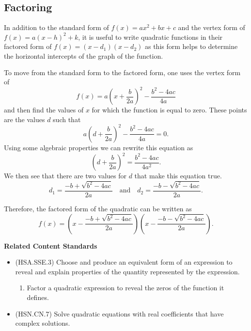 \documentclass[
]{book}
\providecommand{\tightlist}{%
  \setlength{\itemsep}{0pt}\setlength{\parskip}{0pt}}
\newenvironment{standards}{}{}
\theoremstyle{definition}
\theoremstyle{definition}
\theoremstyle{definition}
\theoremstyle{definition}
\theoremstyle{remark}
\begin{document}
\hypertarget{factoring}{%
\subsection{Factoring}\label{factoring}}

In addition to the standard form of \(f(x)=ax^2+bx+c\) and the vertex form of \(f(x)=a(x-h)^2+k\), it is useful to write quadratic functions in their factored form of \(f(x)=(x-d_1)(x-d_2)\) as this form helps to determine the horizontal intercepts of the graph of the function.

To move from the standard form to the factored form, one uses the vertex form of \[f(x) = a \left(x+\frac{b}{2a}  \right)^2- \frac{b^2-4ac}{4a}\] and then find the values of \(x\) for which the function is equal to zero. These points are the values \(d\) such that
\[a\left(d+\frac{b}{2a}  \right)^2- \frac{b^2-4ac}{4a}=0.\] Using some algebraic properties we can rewrite this equation as \[\left(d+\frac{b}{2a}  \right)^2= \frac{b^2-4ac}{4a^2}.\]
We then see that there are two values for \(d\) that make this equation true.
\[d_1 = \frac{-b+\sqrt{b^2-4ac}}{2a} \quad \mbox{and} \quad d_2 = \frac{-b-\sqrt{b^2-4ac}}{2a}.\]

Therefore, the factored form of the quadratic can be written as
\[f(x) = \left( x- \frac{-b+\sqrt{b^2-4ac}}{2a}\right) \left(x- \frac{-b-\sqrt{b^2-4ac}}{2a}\right).\]

\begin{standards}

\begin{center}
\textbf{Related Content Standards}

\end{center}

\begin{itemize}
\tightlist
\item
  (HSA.SSE.3) Choose and produce an equivalent form of an expression to reveal and explain properties of the quantity represented by the expression.

  \begin{enumerate}
  \def\labelenumi{\alph{enumi}.}
  \tightlist
  \item
    Factor a quadratic expression to reveal the zeros of the function it defines.
  \end{enumerate}
\item
  (HSN.CN.7) Solve quadratic equations with real coefficients that have complex solutions.
\end{itemize}

\end{standards}
\end{document}
